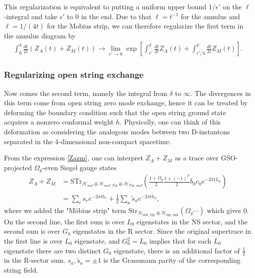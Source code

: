\documentclass[12pt]{article}
\newcommand{\ie}{\begin{equation}\begin{aligned}}
\newcommand{\fe}{\end{aligned}\end{equation}}
\begin{document}
This regularization is equivalent to putting a uniform upper bound $1/\epsilon'$ on the $\ell$-integral and take $\epsilon'$ to 0 in the end. Due to that $\ell = t^{-1}$ for the annulus and $\ell = 1/(4t)$ for the Mobius strip, we can therefore regularize the first term in the annulus diagram by
\ie
\int_0^\delta\frac{dt}{2t}(Z_A(t)+Z_M(t)) \rightarrow \lim_{\epsilon' \rightarrow 0} \exp\left[\int_{\epsilon'}^{\delta} \frac{dt}{2t}Z_A(t)+\int_{\epsilon'/4}^{\delta} \frac{dt}{2t} Z_M(t)\right].
\fe

\subsubsection*{Regularizing open string exchange}

Now comes the second term, namely the integral from $\delta$ to $\infty$. The divergences in this term come from open string zero mode exchange, hence it can be treated by deforming the boundary condition such that the open string ground state acquires a nonzero conformal weight $h$. Physically, one can think of this deformation as considering the analogous modes between two D-instantons separated in the 4-dimensional non-compact spacetime. 

From the expression \eqref{Zazm}, one can interpret $Z_A+Z_M$ as a trace over GSO-projected $\Omega_g$-even Siegel gauge states
\ie 
Z_A+Z_M&=\mathrm{STr}_\mathcal{H_\text{inst}\oplus \mathcal{H}_\text{inst, Dp}\oplus \mathcal{H}_\text{Dp, inst}}\left(\frac{1+\Omega_g}{2} \frac{1+(-1)^F}{2}b_0 c_0 e^{-2\pi t L_0}\right)\\
&=\sum_{r} s_r e^{-2\pi t h_r} + \frac{1}{2}\sum_a \tilde{s}_a e^{-2\pi t \tilde{h}_a},
\fe
where we added the "M\"obius strip" term $\mathrm{Str}_{\mathcal{H}_\text{inst, Dp}\oplus \mathcal{H}_\text{Dp, inst}}(\Omega_g \cdots)$ which gives 0. On the second line, the first sum is over $L_0$ eigenstates in the NS sector, and the second sum is over $G_0$ eigenstates in the R sector. Since the original supertrace in the first line is over $L_0$ eigenstate, and $G_0^2=L_0$ implies that for each $L_0$ eigenstate there are two distinct $G_0$ eigenstate, there is an additional factor of $\frac{1}{2}$ in the R-sector sum. $s_a, \tilde{s}_a= \pm 1$ is the Grassmann parity of the corresponding string field. 
\end{document}

